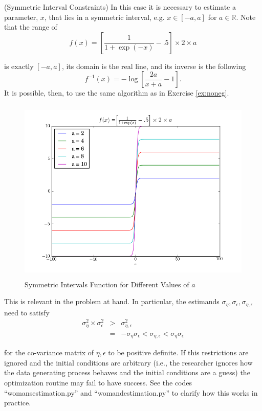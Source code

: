 \begin{example} (Symmetric Interval Constraints)
In this case it is necessary to estimate a parameter, $x$, that lies in a symmetric interval, e.g. $x \in [-a,a]$ for  $a \in \mathbb{R}$. Note that the range of
\begin{equation}
f(x) = \left[ \frac{1}{1+ \exp(-x)} -.5 \right] \times 2 \times a
\end{equation}

\noindent is exactly $[-a,a]$, its domain is the real line, and its inverse is the following 
\begin{equation}
f^{-1}(x) = - \log \left[ \frac{2a}{x+a} - 1 \right].
\end{equation}
\noindent It is possible, then, to use the same algorithm as in Exercise \ref{ex:noneg}.
\end{example}

\begin{center}
\begin{figure}[H]
\caption{Symmetric Intervals Function for Different Values of $a$}
\centering
\includegraphics[width=4.5in, height=3.5in]{Code/other/symmetric_intervals.png}
\end{figure}
\end{center}

\indent This is relevant in the problem at hand. In particular, the estimands $\sigma_{\eta},\sigma_{\epsilon},\sigma_{\eta,\epsilon}$ need to satisfy
\begin{eqnarray}
\sigma_{\eta}^2 \times \sigma_{\epsilon}^2 &>& \sigma_{\eta,\epsilon}^2 \nonumber \\
&=& -\sigma_{\eta} \sigma_{\epsilon} < \sigma_{\eta,\epsilon} < \sigma_{\eta} \sigma_{\epsilon}
\end{eqnarray}

\noindent for the co-variance matrix of $\eta,\epsilon$ to be positive definite. If this restrictions are ignored and the initial conditions are arbitrary (i.e., the researcher ignores how the data generating process behaves and the initial conditions are a guess) the optimization routine may fail to have success. See the codes ``womansestimation.py'' and ``womandestimation.py'' to clarify how this works in practice.

